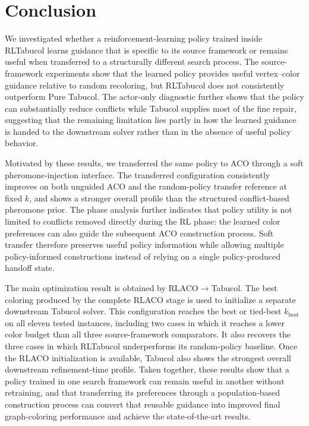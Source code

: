 \section{Conclusion}
\label{sec:conclusion}

We investigated whether a reinforcement-learning policy trained inside
RLTabucol learns guidance that is specific to its source framework or remains
useful when transferred to a structurally different search process. The
source-framework experiments show that the learned policy provides useful
vertex--color guidance relative to random recoloring, but RLTabucol does not
consistently outperform Pure Tabucol. The actor-only diagnostic further shows
that the policy can substantially reduce conflicts while Tabucol supplies most
of the fine repair, suggesting that the remaining limitation lies partly in how
the learned guidance is handed to the downstream solver rather than in the
absence of useful policy behavior.

Motivated by these results, we transferred the same policy to ACO
through a soft pheromone-injection interface. The transferred configuration
consistently improves on both unguided ACO and the random-policy transfer
reference at fixed $k$, and shows a stronger overall profile than the structured
conflict-based pheromone prior. The phase analysis further indicates that policy
utility is not limited to conflicts removed directly during the RL phase: the
learned color preferences can also guide the subsequent ACO construction
process. Soft transfer therefore preserves useful policy information while
allowing multiple policy-informed constructions instead of relying on a single
policy-produced handoff state.

The main optimization result is obtained by
RLACO$\rightarrow$Tabucol. The best coloring produced by the complete RLACO
stage is used to initialize a separate downstream Tabucol solver. This
configuration reaches the best or tied-best $k_{\mathrm{best}}$ on all eleven
tested instances, including two cases in which it reaches a lower color budget
than all three source-framework comparators. It also recovers the three cases
in which RLTabucol underperforms its random-policy baseline. Once the RLACO
initialization is available, Tabucol also shows the strongest overall
downstream refinement-time profile. Taken together, these results show that a
policy trained in one search framework can remain useful in another without
retraining, and that transferring its preferences through a population-based
construction process can convert that reusable guidance into improved final
graph-coloring performance and achieve the state-of-the-art results.

